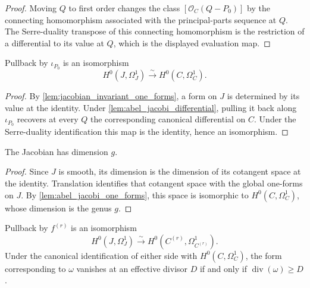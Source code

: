 \begin{proof}
  Moving \(Q\) to first order changes the class
  \([\mathcal O_C(Q-P_0)]\) by the connecting homomorphism associated with
  the principal-parts sequence at \(Q\).  The Serre-duality transpose of
  this connecting homomorphism is the restriction of a differential to its
  value at \(Q\), which is the displayed evaluation map.
\end{proof}

\begin{lemma}
  \label{lem:abel_jacobi_one_forms}

  Pullback by \(\iota_{P_0}\) is an isomorphism
  \[
    H^0(J,\Omega_J^1)\xrightarrow{\sim}H^0(C,\Omega_C^1).
  \]
\end{lemma}

\begin{proof}
  By \cref{lem:jacobian_invariant_one_forms}, a form on \(J\) is determined
  by its value at the identity.  Under
  \cref{lem:abel_jacobi_differential}, pulling it back along
  \(\iota_{P_0}\) recovers at every \(Q\) the corresponding canonical
  differential on \(C\).  Under the Serre-duality identification this map
  is the identity, hence an isomorphism.
\end{proof}

\begin{lemma}
  \label{lem:jacobian_dimension}

  The Jacobian has dimension \(g\).
\end{lemma}

\begin{proof}
  Since \(J\) is smooth, its dimension is the dimension of its cotangent
  space at the identity.  Translation identifies that cotangent space with
  the global one-forms on \(J\).  By
  \cref{lem:abel_jacobi_one_forms}, this space is isomorphic to
  \(H^0(C,\Omega_C^1)\), whose dimension is the genus \(g\).
\end{proof}

\begin{proposition}
  \label{prop:symmetric_product_differentials}

  Pullback by \(f^{(r)}\) is an isomorphism
  \[
    H^0(J,\Omega_J^1)\xrightarrow{\sim}
    H^0(C^{(r)},\Omega_{C^{(r)}}^1).
  \]
  Under the canonical identification of either side with
  \(H^0(C,\Omega_C^1)\), the form corresponding to \(\omega\) vanishes at
  an effective divisor \(D\) if and only if
  \(\operatorname{div}(\omega)\ge D\).
\end{proposition}

